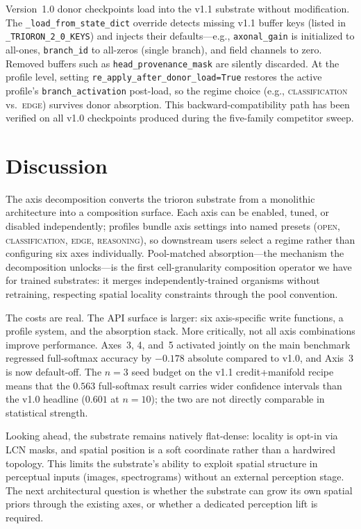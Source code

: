 \documentclass[11pt]{article}
\begin{document}
Version~1.0 donor checkpoints load into the v1.1 substrate without
modification.
The \texttt{\_load\_from\_state\_dict} override detects missing v1.1
buffer keys (listed in \texttt{\_TRIORON\_2\_0\_KEYS}) and injects their
defaults---e.g., \texttt{axonal\_gain} is initialized to all-ones,
\texttt{branch\_id} to all-zeros (single branch), and field channels to
zero.
Removed buffers such as \texttt{head\_provenance\_mask} are silently
discarded.
At the profile level, setting \texttt{re\_apply\_after\_donor\_load=True}
restores the active profile's \texttt{branch\_activation} post-load, so
the regime choice (e.g., \textsc{classification} vs.\ \textsc{edge})
survives donor absorption.
This backward-compatibility path has been verified on all v1.0
checkpoints produced during the five-family competitor sweep.


\section{Discussion}
\label{sec:discussion}

The axis decomposition converts the trioron substrate from a monolithic
architecture into a composition surface.
Each axis can be enabled, tuned, or disabled independently; profiles
bundle axis settings into named presets (\textsc{open},
\textsc{classification}, \textsc{edge}, \textsc{reasoning}), so
downstream users select a regime rather than configuring six axes
individually.
Pool-matched absorption---the mechanism the decomposition unlocks---is
the first cell-granularity composition operator we have for trained
substrates: it merges independently-trained organisms without
retraining, respecting spatial locality constraints through the pool
convention.

The costs are real.
The API surface is larger: six axis-specific write functions, a profile
system, and the absorption stack.
More critically, not all axis combinations improve performance.
Axes~3, 4, and~5 activated jointly on the main benchmark regressed
full-softmax accuracy by $-0.178$ absolute compared to v1.0, and Axis~3
is now default-off.
The $n{=}3$ seed budget on the v1.1 credit+manifold recipe means that
the $0.563$ full-softmax result carries wider confidence intervals than
the v1.0 headline ($0.601$ at $n{=}10$); the two are not directly
comparable in statistical strength.

Looking ahead, the substrate remains natively flat-dense: locality is
opt-in via LCN masks, and spatial position is a soft coordinate rather
than a hardwired topology.
This limits the substrate's ability to exploit spatial structure in
perceptual inputs (images, spectrograms) without an external perception
stage.
The next architectural question is whether the substrate can grow its own
spatial priors through the existing axes, or whether a dedicated
perception lift is required.
\end{document}
